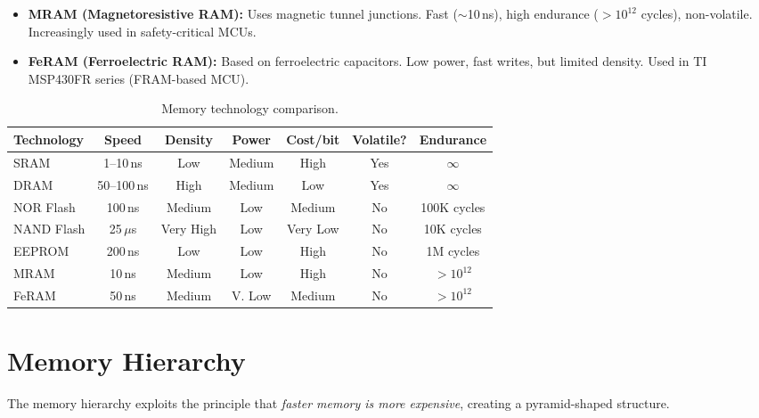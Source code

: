 \begin{itemize}
  \item \textbf{MRAM (Magnetoresistive RAM):} Uses magnetic tunnel junctions. Fast ($\sim$10\,ns), high endurance ($>10^{12}$ cycles), non-volatile. Increasingly used in safety-critical MCUs.
  \item \textbf{FeRAM (Ferroelectric RAM):} Based on ferroelectric capacitors. Low power, fast writes, but limited density. Used in TI MSP430FR series (FRAM-based MCU).
\end{itemize}

\begin{table}[H]
\centering
\caption{Memory technology comparison.}
\label{tab:mem:techcomp}
\begin{tabularx}{\textwidth}{l c c c c c c}
\toprule
\textbf{Technology} & \textbf{Speed} & \textbf{Density} & \textbf{Power} & \textbf{Cost/bit} & \textbf{Volatile?} & \textbf{Endurance} \\
\midrule
SRAM & 1--10\,ns & Low & Medium & High & Yes & $\infty$ \\
DRAM & 50--100\,ns & High & Medium & Low & Yes & $\infty$ \\
NOR Flash & 100\,ns & Medium & Low & Medium & No & 100K cycles \\
NAND Flash & 25\,$\mu$s & Very High & Low & Very Low & No & 10K cycles \\
EEPROM & 200\,ns & Low & Low & High & No & 1M cycles \\
MRAM & 10\,ns & Medium & Low & High & No & $>10^{12}$ \\
FeRAM & 50\,ns & Medium & V. Low & Medium & No & $>10^{12}$ \\
\bottomrule
\end{tabularx}
\end{table}

\section{Memory Hierarchy}
\label{sec:mem:hierarchy}

The memory hierarchy exploits the principle that \emph{faster memory is more expensive}, creating a pyramid-shaped structure.

